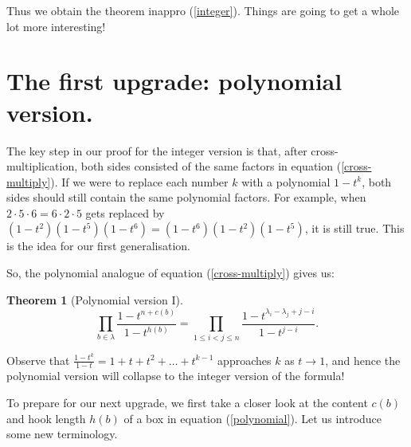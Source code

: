 \documentclass[a4paper,11pt]{amsart}
\newtheorem*{theorem*}{Theorem}
\begin{document}
	
	Thus we obtain the theorem inappro (\ref{integer}). Things are going to get a whole lot more interesting!
	
\section{The first upgrade: polynomial version.}
The key step in our proof for the integer version is that, after cross-multiplication, both sides consisted of the same factors in equation (\ref{cross-multiply}). If we were to replace each number $k$ with a polynomial $1-t^k$, both sides should still contain the same polynomial factors. For example, when $2\cdot5\cdot6 = 6\cdot2\cdot5$ gets replaced by $ (1-t^2)(1-t^5)(1-t^6) = (1-t^6)(1-t^2)(1-t^5)$, it is still true. This is the idea for our first generalisation.

So, the polynomial analogue of equation (\ref{cross-multiply}) gives us:

\begin{theorem*}[Polynomial version I] \emph{\cite[Ch.\ I §3 Ex.\ 1]{MR1354144}} %
			\begin{equation}
				\prod_{b\in \lambda} \dfrac{1-t^{n+c(b)}}{1-t^{h(b)}} = \prod_{1\leq i <j \leq n} \dfrac{1-t^{\lambda_i-\lambda_j+j-i}}{1-t^{j-i}}.
				\label{polynomial}\tag{D}
			\end{equation}
			
\end{theorem*} 

Observe that $\frac{1-t^k}{1-t} = 1+t+t^2+\ldots+t^{k-1}$ approaches $k$ as $t \rightarrow 1$, and hence the polynomial version will collapse to the integer version of the formula!
		
To prepare for our next upgrade, we first take a closer look at the content $c(b)$ and hook length $h(b)$ of a box in equation (\ref{polynomial}). Let us introduce some new terminology.
\end{document}
